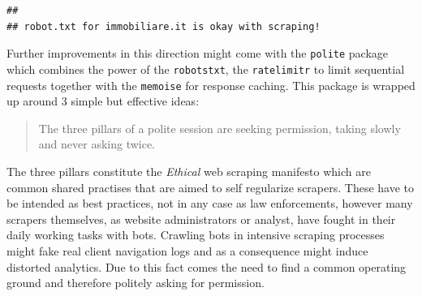 \documentclass[
  12pt,
  a4paper,
  oneside]{book}
\newenvironment{Shaded}{\begin{snugshade}}{\end{snugshade}}
\newcommand{\CharTok}[1]{\textcolor[rgb]{0.31,0.60,0.02}{#1}}
\newcommand{\CommentTok}[1]{\textcolor[rgb]{0.56,0.35,0.01}{\textit{#1}}}
\newcommand{\ControlFlowTok}[1]{\textcolor[rgb]{0.13,0.29,0.53}{\textbf{#1}}}
\newcommand{\DataTypeTok}[1]{\textcolor[rgb]{0.13,0.29,0.53}{#1}}
\newcommand{\DecValTok}[1]{\textcolor[rgb]{0.00,0.00,0.81}{#1}}
\newcommand{\KeywordTok}[1]{\textcolor[rgb]{0.13,0.29,0.53}{\textbf{#1}}}
\newcommand{\NormalTok}[1]{#1}
\newcommand{\OperatorTok}[1]{\textcolor[rgb]{0.81,0.36,0.00}{\textbf{#1}}}
\newcommand{\StringTok}[1]{\textcolor[rgb]{0.31,0.60,0.02}{#1}}
\theoremstyle{definition}
\theoremstyle{definition}
\theoremstyle{definition}
\theoremstyle{remark}
\begin{document}
\begin{Shaded}
\end{Shaded}

\begin{verbatim}
## 
## robot.txt for immobiliare.it is okay with scraping!
\end{verbatim}

Further improvements in this direction might come with the \texttt{polite} package \citep{polite} which combines the power of the \texttt{robotstxt}, the \texttt{ratelimitr} \citep{ratelimitr} to limit sequential requests together with the \texttt{memoise} \citep{memoise} for response caching. This package is wrapped up around 3 simple but effective ideas:

\begin{quote}
The three pillars of a polite session are seeking permission, taking slowly and never asking twice.
\end{quote}

The three pillars constitute the \emph{Ethical} web scraping manifesto \citep{densmore_2019} which are common shared practises that are aimed to self regularize scrapers. These have to be intended as best practices, not in any case as law enforcements, however many scrapers themselves, as website administrators or analyst, have fought in their daily working tasks with bots. Crawling bots in intensive scraping processes might fake real client navigation logs and as a consequence might induce distorted analytics. Due to this fact comes the need to find a common operating ground and therefore politely asking for permission.
\end{document}
